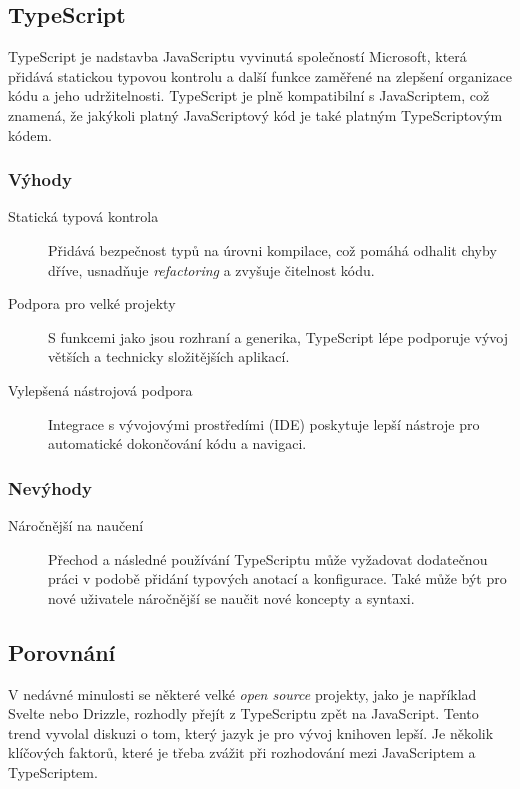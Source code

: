 \subsection{TypeScript}
TypeScript je nadstavba JavaScriptu vyvinutá společností Microsoft, která přidává statickou typovou kontrolu a další funkce zaměřené na zlepšení organizace kódu a jeho udržitelnosti. TypeScript je plně kompatibilní s JavaScriptem, což znamená, že jakýkoli platný JavaScriptový kód je také platným TypeScriptovým kódem. \cite{TypeScript}

\subsubsection{Výhody}

\begin{description}
    \item[Statická typová kontrola] Přidává bezpečnost typů na úrovni kompilace, což pomáhá odhalit chyby dříve, usnadňuje \emph{refactoring} a zvyšuje čitelnost kódu.
    \item[Podpora pro velké projekty] S funkcemi jako jsou rozhraní a generika, TypeScript lépe podporuje vývoj větších a technicky složitějších aplikací.
    \item[Vylepšená nástrojová podpora] Integrace s vývojovými prostředími (IDE) poskytuje lepší nástroje pro automatické dokončování kódu a navigaci.
\end{description}

\subsubsection{Nevýhody}

\begin{description}
    \item[Náročnější na naučení] Přechod a následné používání TypeScriptu může vyžadovat dodatečnou práci v podobě přidání typových anotací a konfigurace. Také může být pro nové uživatele náročnější se naučit nové koncepty a syntaxi.
\end{description}

\subsection{Porovnání}
V nedávné minulosti se některé velké \emph{open source} projekty, jako je například Svelte nebo Drizzle, rozhodly přejít z TypeScriptu zpět na JavaScript. Tento trend vyvolal diskuzi o tom, který jazyk je pro vývoj knihoven lepší. Je několik klíčových faktorů, které je třeba zvážit při rozhodování mezi JavaScriptem a TypeScriptem.

